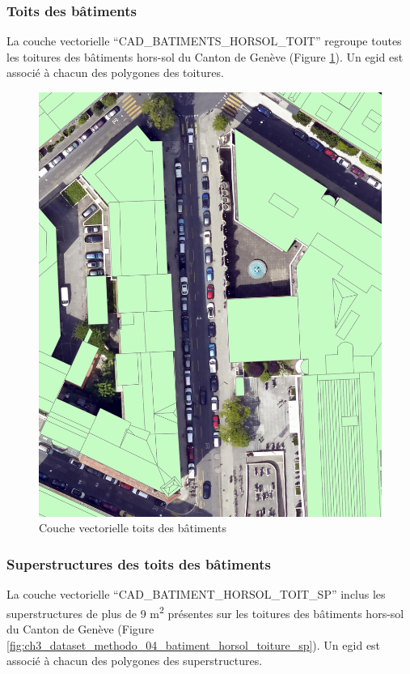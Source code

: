 \newpage
\subsubsection{Toits des bâtiments}
La couche vectorielle ``CAD\_BATIMENTS\_HORSOL\_TOIT'' \cite{sitg_toits_nodate} regroupe toutes les toitures des bâtiments hors-sol du Canton de Genève (Figure \ref{fig:ch3_dataset_methodo_03_batiment_horsol_toiture}). Un \gls{egid} est associé à chacun des polygones des toitures.

\begin{figure}[H]
    \centering
    \includegraphics[width=1\linewidth]{02-main//figures/ch3/ch3_dataset_methodo_03_batiment_horsol_toiture.png}
    \caption{Couche vectorielle toits des bâtiments}
    \label{fig:ch3_dataset_methodo_03_batiment_horsol_toiture}
\end{figure}

\newpage
\subsubsection{Superstructures des toits des bâtiments}
La couche vectorielle ``CAD\_BATIMENT\_HORSOL\_TOIT\_SP'' \cite{sitg_toits_nodate} inclus les superstructures de plus de 9 \si{\unit{\square\meter}} présentes sur les toitures des bâtiments hors-sol du Canton de Genève (Figure \ref{fig:ch3_dataset_methodo_04_batiment_horsol_toiture_sp}). Un \gls{egid} est associé à chacun des polygones des superstructures.

